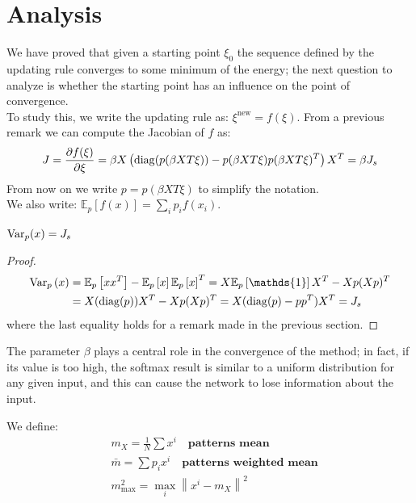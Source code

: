 \section{Analysis}
We have proved that given a starting point $\xi_0$ the sequence defined by the updating rule converges to some minimum of the energy; the next question to analyze is whether the starting point has an influence on the point of convergence.\\
To study this, we write the updating rule as:
$\xi^{\text{new}} = f(\xi)$. From a previous remark we can compute the Jacobian of $f$ as:
\[
J = \frac{\partial f(\xi)}{\partial \xi} = \beta X \left(\operatorname{diag}(p(\beta XT \xi)) - p(\beta XT \xi)p(\beta XT \xi)^T \right)X^T = \beta J_s
\]
From now on we write $p = p(\beta XT \xi)$ to simplify the notation. \\
We also write: $\mathbb{E}_p\left[f(x)\right] = \sum_i p_i f(x_i)$.
\begin{lemma}
    $\textnormal{Var}_p(x) = J_s$
    \begin{proof}
        \begin{align*}
            \text{Var}_p\left(x\right) &= \mathbb{E}_p\left[xx^T\right] - \mathbb{E}_p\left[x\right] \mathbb{E}_p\left[x\right]^T = X \mathbb{E}_p\left[\mathds{1}\right]X^T - Xp (Xp)^T \\
            &= X(\diagonal(p))X^T -  Xp (Xp)^T =
            X(\diagonal(p) - p p^T) X^T = J_s
        \end{align*}
        where the last equality holds for a remark made in the previous section.
    \end{proof}
\end{lemma}
The parameter $\beta$ plays a central role in the convergence of the method; in fact, if its value is too high, the softmax result is similar to a uniform distribution for any given input, and this can cause the network to lose information about the input.
\begin{definition}
    We define:
    \begin{align*}
        &m_X = \frac1N \sum x^i \quad \textbf{patterns mean} \\
        &\bar{m} = \sum p_i x^i \quad \textbf{patterns weighted mean} \\
        &m^2_{\max} = \max_i \left\|x^i - m_X\right\|^2
    \end{align*}
\end{definition}
